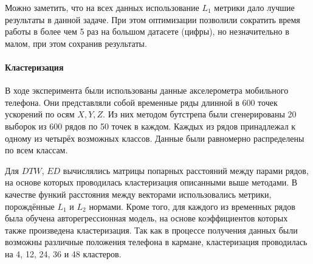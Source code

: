 \documentclass[12pt,twoside]{article}
\begin{document}
        Можно заметить, что на всех данных использование $L_1$ метрики дало лучшие результаты в данной задаче.
        При этом оптимизации позволили сократить время работы в более чем 5 раз на большом датасете (цифры),
            но незначительно в малом, при этом сохранив результаты.

        
        \paragraph{Кластеризация}
        В ходе эксперимента были использованы данные акселерометра мобильного телефона.
        Они представляли собой временные ряды длинной в 600 точек ускорений по осям $X, Y, Z$.
        Из них методом бутстрепа были сгенерированы 20 выборок из 600 рядов по 50 точек в каждом. 
        Каждых из рядов принадлежал к одному из четырёх возможных классов. Данные были равномерно распределены по всем классам.

        Для $DTW$, $ED$ вычислялись матрицы попарных расстояний между парами рядов, на основе которых проводилась кластеризация описанными выше методами.
        В качестве функий расстояния между векторами использовались метрики, порождённые $L_1$  и $L_2$ нормами.
        Кроме того, для каждого из временных рядов была обучена авторегрессионная модель, на основе коэффициентов которых также произведена кластеризация.
        Так как в процессе получения данных были возможны различные положения телефона в кармане, кластеризация проводилась на 4, 12, 24, 36 и 48 кластеров.
\end{document}
